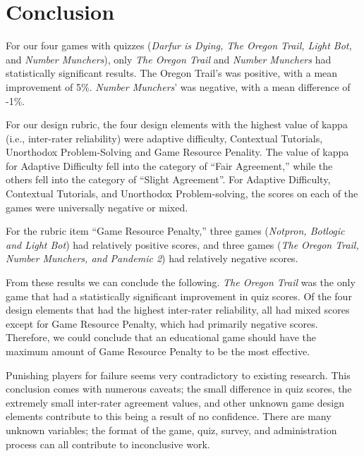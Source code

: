 \documentclass[12pt]{report}
\begin{document}






\chapter{Conclusion}
	For our four games with quizzes (\textit{Darfur is Dying, The Oregon Trail, Light Bot,} and \textit{Number Munchers}), only \textit{The Oregon Trail} and \textit{Number Munchers} had statistically significant results. The Oregon Trail's was positive, with a mean improvement of 5\%. \textit{Number Munchers}' was negative, with a mean difference of -1\%.

	For our design rubric, the four design elements with the highest value of kappa (i.e., inter-rater reliability) were adaptive difficulty, Contextual Tutorials, Unorthodox Problem-Solving and Game Resource Penality.  The value of kappa for Adaptive Difficulty fell into the category of ``Fair Agreement,'' while the others fell into the category of ``Slight Agreement''. For Adaptive Difficulty, Contextual Tutorials, and Unorthodox Problem-solving, the scores on each of the games were universally negative or mixed.

	For the rubric item ``Game Resource Penalty,'' three games (\textit{Notpron, Botlogic and Light Bot}) had relatively positive scores, and three games (\textit{The Oregon Trail, Number Munchers, and Pandemic 2}) had relatively negative scores.

	From these results we can conclude the following. \textit{The Oregon Trail} was the only game that had a statistically significant improvement in quiz scores.  Of the four design elements that had the highest inter-rater reliability, all had mixed scores except for Game Resource Penalty, which had primarily negative scores.  Therefore, we could conclude that an educational game should have the maximum amount of Game Resource Penalty to be the most effective.
	
	Punishing players for failure seems very contradictory to existing research. This conclusion comes with numerous caveats; the small difference in quiz scores, the extremely small inter-rater agreement values, and other unknown game design elements contribute to this being a result of no confidence. There are many unknown variables; the format of the game, quiz, survey, and administration process can all contribute to inconclusive work.
\end{document}
